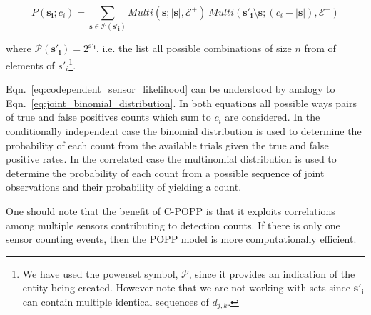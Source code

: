 \begin{equation}
\label{eq:codependent_sensor_likelihood}
P(\mathbf{s_i} ; c_i) = \sum\limits_{\mathbf{s} \in \mathcal{P}(\mathbf{s'_i})} Multi(\mathbf{s} ; |\mathbf{s}|, \mathcal E^+) ~ Multi(\mathbf{s'_i}\setminus \mathbf{s} ; (c_i - |\mathbf{s}|), \mathcal E^-)
\end{equation}

\noindent where $\mathcal{P}(\mathbf{s'_i}) = 2^{\mathbf{s'_i}}$, i.e. the list all possible combinations of size $n$ from of elements of $s'_i$\footnote{We have used the powerset symbol, $\mathcal{P}$, since it provides an indication of the entity being created. However note that we are not working with sets since $\mathbf{s'_i}$ can contain multiple identical sequences of $d_{j,k}$.}. 


Eqn.~\ref{eq:codependent_sensor_likelihood} can be understood by analogy to Eqn.~\ref{eq:joint_binomial_distribution}. In both equations all possible ways pairs of true and false positives counts which sum to $c_i$ are considered. In the conditionally independent case the binomial distribution is used to determine the probability of each count from the available trials given the true and false positive rates. In the correlated case the multinomial distribution is used to determine the probability of each count from a possible sequence of joint observations and their probability of yielding a count.

One should note that the benefit of C-POPP is that it exploits correlations among multiple sensors contributing to detection counts. If there is only one sensor counting events, then the POPP model is more computationally efficient.
